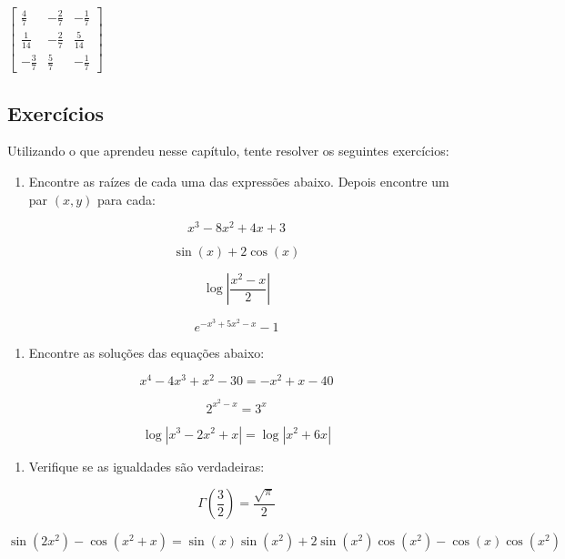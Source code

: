 \documentclass[a4paper, 11pt, brazilian]{article}
\providecommand{\tightlist}{%
      \setlength{\itemsep}{0pt}\setlength{\parskip}{0pt}}
\newcommand{\prompt}[4]{
        \ttfamily\llap{{\color{#2}[#3]:\hspace{3pt}#4}}\vspace{-\baselineskip}
    }
\begin{document}
            
\prompt{Out}{outcolor}{40}{}
    
    $\displaystyle \left[\begin{matrix}\frac{4}{7} & - \frac{2}{7} & - \frac{1}{7}\\\frac{1}{14} & - \frac{2}{7} & \frac{5}{14}\\- \frac{3}{7} & \frac{5}{7} & - \frac{1}{7}\end{matrix}\right]$

    

    \hypertarget{exercuxedcios}{%
\subsection{Exercícios}\label{exercuxedcios}}

Utilizando o que aprendeu nesse capítulo, tente resolver os seguintes
exercícios:

\begin{enumerate}
\def\labelenumi{\arabic{enumi}.}
\tightlist
\item
  Encontre as raízes de cada uma das expressões abaixo. Depois encontre
  um par \((x,y)\) para cada:
\end{enumerate}

\[x^3 - 8x^2 + 4x + 3 \]

\[\sin(x) + 2\cos(x)\]

\[\log\left|\dfrac{x^2 - x}{2}\right|\]

\[e^{-x^3 + 5x^2 -x} -1\]

\begin{enumerate}
\def\labelenumi{\arabic{enumi}.}
\setcounter{enumi}{1}
\tightlist
\item
  Encontre as soluções das equações abaixo:
\end{enumerate}

\[x^4 - 4x^3 + x^2 - 30 = -x^2 + x - 40\]

\[2^{x^2 -x} = 3^x\]

\[\log\left|x^3 - 2x^2 +x\right| = \log\left|x^2 + 6x\right|\]

\begin{enumerate}
\def\labelenumi{\arabic{enumi}.}
\setcounter{enumi}{2}
\tightlist
\item
  Verifique se as igualdades são verdadeiras:
\end{enumerate}

\[\Gamma\left(\dfrac{3}{2}\right) = \dfrac{\sqrt{\pi}}{2}\]

\[\sin(2x^2) - \cos(x^2 +x) = \sin{\left(x \right)} \sin{\left(x^{2} \right)} + 2 \sin{\left(x^{2} \right)} \cos{\left(x^{2} \right)} - \cos{\left(x \right)} \cos{\left(x^{2} \right)}\]
\end{document}
